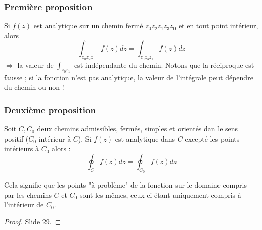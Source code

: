\subsubsection{Première proposition}
Si $f(z)$ est analytique sur un chemin fermé $z_0z_2z_1z_3z_0$ et en tout point
intérieur, alors
\begin{equation}
	\int_{z_0z_2z_1} f(z) dz = \int_{z_0z_3z_1} f(z) dz
\end{equation}
$\Rightarrow$ la valeur de $\int_{z_0z_1}$ est indépendante du chemin. Notons
que la réciproque est fausse ; si la fonction n'est pas analytique, la valeur
de l'intégrale peut dépendre du chemin ou non !\\
        
        
\subsubsection{Deuxième proposition}
Soit $C, C_0$ deux chemins admissibles, fermés, simples et orientés dan le sens
positif ($C_0$ intérieur à $C$). Si $f(z)$ est analytique dans $C$ excepté les
points intérieurs à $C_0$ alors :
\begin{equation}
	\oint_C f(z) dz = \oint_{C_0} f(z) dz
\end{equation}
        
Cela signifie que les points "à problème" de la fonction sur le domaine compris par les chemins $C$ et $C_0$ sont les mêmes, ceux-ci étant uniquement compris à l'intérieur de $C_0$.
        
\begin{proof}
	Slide 29.
\end{proof}
        
        
